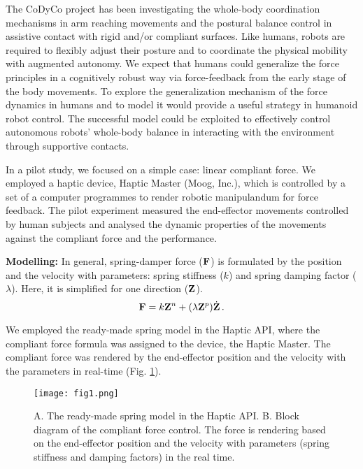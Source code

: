 The CoDyCo project has been investigating the whole-body coordination mechanisms in arm reaching movements and the postural balance control in assistive contact with rigid and/or compliant surfaces. Like humans, robots are required to flexibly adjust their posture and to coordinate the physical mobility with augmented autonomy. We expect that humans could generalize the force principles in a cognitively robust way via force-feedback from the early stage of the body movements. To explore the generalization mechanism of the force dynamics in humans and to model it would provide a useful strategy in humanoid robot control. The successful model could be exploited to effectively control autonomous robots' whole-body balance in interacting with the environment through supportive contacts.

In a pilot study, we focused on a simple case: linear compliant force. We employed a haptic device, Haptic Master (Moog, Inc.), which is controlled by a set of a computer programmes to render robotic manipulandum for force feedback. The pilot experiment measured the end-effector movements controlled by human subjects and analysed the dynamic properties of the movements against the compliant force and the performance.




\textbf{Modelling:} In general, spring-damper force ($\mathbf{F}$) is formulated by the position and the velocity with parameters: spring stiffness ($k$) and spring damping factor ($\lambda$). Here, it is simplified for one direction ($\mathbf{Z}$).
%
\begin{equation}
\mathbf{F} = k \mathbf{Z}^n + (\lambda \mathbf{Z}^p) \dot{\mathbf{Z}} \, .
\end{equation}
%

We employed the ready-made spring model in the Haptic API, where the compliant force formula was assigned to the device, the Haptic Master. The compliant force was rendered by the end-effector position and the velocity with the parameters in real-time (Fig. \ref{modelling}). 
%
\begin{figure}
	\centering
	\texttt{[image: fig1.png]}
	\caption{A. The ready-made spring model in the Haptic API. B. Block diagram of the compliant force control. The force is rendering based on the end-effector position and the velocity with parameters (spring stiffness and damping factors) in the real time.}
	\label{modelling}
\end{figure}



